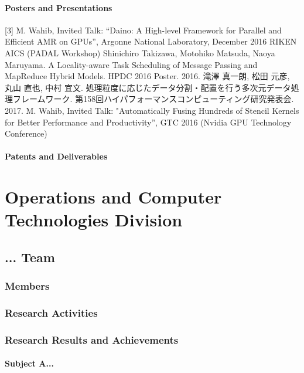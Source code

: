 \documentclass{book}
\begin{document}
\subsection{Posters and Presentations}
[3] M. Wahib, Invited Talk: “Daino: A High-level Framework for Parallel and Efficient AMR on GPUs”, Argonne National Laboratory, December 2016
RIKEN AICS (PADAL Workshop) \newline
[4] Shinichiro Takizawa, Motohiko Matsuda, Naoya Maruyama. A Locality-aware Task Scheduling of Message Passing and MapReduce Hybrid Models. HPDC 2016 Poster. 2016. \newline
[5] 滝澤 真一朗, 松田 元彦, 丸山 直也, 中村 宜文. 処理粒度に応じたデータ分割・配置を行う多次元データ処理フレームワーク. 第158回ハイパフォーマンスコンピューティング研究発表会. 2017. \newline
[6] M. Wahib, Invited Talk: "Automatically Fusing Hundreds of Stencil Kernels for Better Performance and Productivity”, GTC 2016 (Nvidia GPU Technology Conference) \newline

\subsection{Patents and Deliverables}

\part{Operations and Computer Technologies Division}

\chapter{... Team}

\section{Members}

\section{Research Activities}

\section{Research Results and Achievements}

\subsection{Subject A...}
\end{document}
